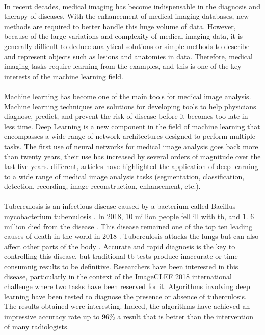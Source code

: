 \paragraph{}
In recent decades, medical imaging has become indispensable in the diagnosis and therapy of diseases. With the enhancement of medical imaging databases, new methods are required to better handle this huge volume of data. However, because of the large variations and complexity of medical imaging data, it is generally difficult to deduce analytical solutions or simple methods to describe and represent objects such as lesions and anatomies in data. Therefore, medical imaging tasks require learning from the examples, and this is one of the key interests of the machine learning field.
\paragraph{}
Machine learning has become one of the main tools for medical image analysis. Machine learning techniques are solutions for developing tools to help physicians diagnose, predict, and prevent the risk of disease before it becomes too late in less time. Deep Learning is a new component in the field of machine learning that encompasses a wide range of network architectures designed to perform multiple tasks. The first use of neural networks for medical image analysis goes back more than twenty years, their use has increased by several orders of magnitude over the last five years. different, articles \cite{NNMEEX:1,NNMEEX:2,NNMEEX:3,NNMEEX:4,NNMEEX:5} have highlighted the application of deep learning to a wide range of medical image analysis tasks (segmentation, classification, detection, recording, image reconstruction, enhancement, etc.).
\paragraph{}
Tuberculosis is an infectious disease caused by a bacterium called Bacillus mycobacterium tuberculosis \cite{TBT:1}. In 2018, 10 million people fell ill with \ac{tb}, and 1. 6 million died from the disease \cite{TBT:1}. This disease remained one of the top ten leading causes of death in the world in 2018 \cite{TBT:1}. Tuberculosis attacks the lungs but can also affect other parts of the body \cite{TBT:2}. Accurate and rapid diagnosis is the key to controlling this disease, but traditional \ac{tb} tests produce inaccurate or time consumnig results to be definitive. Researchers have been interested in this disease, particularly in the context of the ImageCLEF 2018\cite{ImageCLEF:1} international challenge \cite{ImageCLEF:1} where two tasks have been reserved for it. Algorithms involving deep learning have been tested to diagnose the presence or absence of tuberculosis. The results obtained were interesting. Indeed, the algorithms have achieved an impressive accuracy rate up to 96\% \cite{NNMEEX:6,NNMEEX:7} a result that is better than the intervention of many radiologists.
